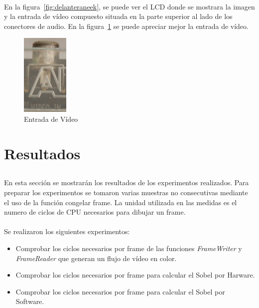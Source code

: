 \documentclass[a4paper,12pt,titlepage,final]{book}
\begin{document}
\paragraph{}
En la figura~\ref{fig:delanteraneek}, se puede ver el LCD donde se mostrara la imagen y la entrada de vídeo compuesto situada en la parte superior al lado de los conectores de audio. En la figura~\ref{fig:VIN} se puede apreciar mejor la entrada de vídeo.  

\begin{figure}[p]
\centering
\includegraphics[width=0.20\textwidth]{./figuras/NEEK/VIN.png}
\caption{Entrada de Vídeo}
\label{fig:VIN}
\end{figure}

\clearpage
\section{Resultados}
\subsection*{}
\subsubsection*{}

\paragraph{}
En esta sección se mostrarán los resultados de los experimentos realizados. Para preparar los experimentos se tomaron varias muestras no consecutivas mediante el uso de la función congelar frame. La unidad utilizada en las medidas es el numero de ciclos de CPU necesarios para dibujar un frame.


\paragraph{}
Se realizaron los siguientes experimentos:
\begin{itemize}
\item Comprobar los ciclos necesarios por frame de las funciones \textit{FrameWriter} y \textit{FrameReader} que generan un flujo de vídeo en color.
\item Comprobar los ciclos necesarios por frame para calcular el Sobel por Harware.
\item Comprobar los ciclos necesarios por frame para calcular el Sobel por Software.
\end{itemize}
\end{document}
